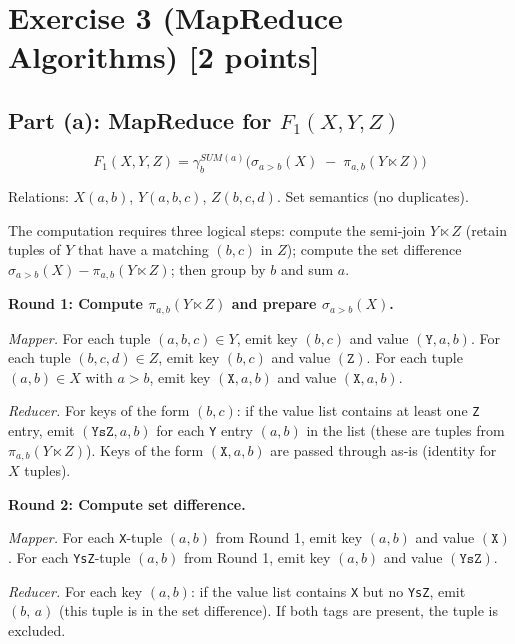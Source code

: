 \documentclass[a4paper,11pt]{article}
\newcommand{\lsj}{\mathbin{\ltimes}}   %
\begin{document}
\newpage
\section*{Exercise 3 (MapReduce Algorithms) [2 points]}

\subsection*{Part (a): MapReduce for $F_1(X, Y, Z)$}

\[
  F_1(X, Y, Z) = \gamma_{b}^{SUM(a)}\!\bigl(\sigma_{a > b}(X) \;-\; \pi_{a,b}(Y \lsj Z)\bigr)
\]

Relations: $X(a,b)$, $Y(a,b,c)$, $Z(b,c,d)$. Set semantics (no duplicates).

The computation requires three logical steps: compute the semi-join $Y \lsj Z$ (retain tuples of $Y$ that have a matching $(b,c)$ in $Z$); compute the set difference $\sigma_{a>b}(X) - \pi_{a,b}(Y \lsj Z)$; then group by $b$ and sum $a$.

\medskip

\textbf{Round 1: Compute $\pi_{a,b}(Y \lsj Z)$ and prepare $\sigma_{a>b}(X)$.}

\textit{Mapper.} For each tuple $(a, b, c) \in Y$, emit key $(b, c)$ and value $(\texttt{Y}, a, b)$. For each tuple $(b, c, d) \in Z$, emit key $(b, c)$ and value $(\texttt{Z})$. For each tuple $(a, b) \in X$ with $a > b$, emit key $(\texttt{X}, a, b)$ and value $(\texttt{X}, a, b)$.

\textit{Reducer.} For keys of the form $(b,c)$: if the value list contains at least one \texttt{Z} entry, emit $(\texttt{YsZ}, a, b)$ for each \texttt{Y} entry $(a, b)$ in the list (these are tuples from $\pi_{a,b}(Y \lsj Z)$). Keys of the form $(\texttt{X}, a, b)$ are passed through as-is (identity for $X$ tuples).

\medskip

\textbf{Round 2: Compute set difference.}

\textit{Mapper.} For each \texttt{X}-tuple $(a, b)$ from Round 1, emit key $(a, b)$ and value $(\texttt{X})$. For each \texttt{YsZ}-tuple $(a, b)$ from Round 1, emit key $(a, b)$ and value $(\texttt{YsZ})$.

\textit{Reducer.} For each key $(a, b)$: if the value list contains \texttt{X} but no \texttt{YsZ}, emit $(b,\, a)$ (this tuple is in the set difference). If both tags are present, the tuple is excluded.
\end{document}
